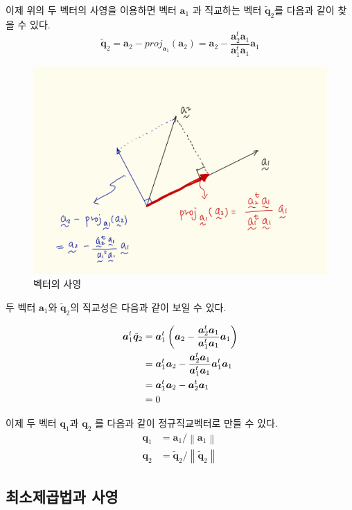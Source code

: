 \documentclass[
]{book}
\newcommand{\norm}[1]{\left\lVert#1\right\rVert}
\theoremstyle{definition}
\theoremstyle{definition}
\theoremstyle{definition}
\theoremstyle{remark}
\begin{document}
이제 위의 두 벡터의 사영을 이용하면 벡터 \(\bm a_1\) 과 직교하는 벡터 \(\tilde {\bm q}_2\)를 다음과 같이 찾을 수 있다.
\[ \tilde {\bm q}_2 = \bm a_2 - proj_{\bm a_1} (\bm a_2) = \bm a_2 -  \frac{\bm a_2^t \bm a_1} {\bm a_1^t \bm a_1} \bm a_1 \]

\begin{figure}
\centering
\includegraphics{proj1.png}
\caption{벡터의 사영}
\end{figure}

두 벡터 \(\bm a_1\)와 \(\tilde {\bm q}_2\)의 직교성은 다음과 같이 보일 수 있다.

\begin{align}
\bm a_1^t  \tilde {\bm q}_2 & =
 \bm a_1^t  \left ( \bm a_2 -  \frac{ \bm a_2^t \bm a_1} {\bm a_1^t \bm a_1} \bm a_1 \right ) \notag \\
 & = \bm a_1^t \bm a_2 - \frac{ \bm a_2^t \bm a_1} {\bm a_1^t \bm a_1}  \bm a_1^t \bm a_1 \notag \\
 & = \bm a_1^t \bm a_2 - \bm a_2^t \bm a_1 \notag \\
 & = 0 
 \label{eq:proofortho}
\end{align}

이제 두 벡터 \(\bm q_1\)과 \(\bm q_2\) 를 다음과 같이 정규직교벡터로 만들 수 있다.
\begin{align*}
\bm q_1 & =  \bm a_1 / \norm{\bm a_1 } \\
\bm q_2 & =  \tilde {\bm q}_2 / \norm{\tilde {\bm q}_2}
\end{align*}

\hypertarget{uxcd5cuxc18cuxc81cuxacf1uxbc95uxacfc-uxc0acuxc601}{%
\subsection{최소제곱법과 사영}\label{uxcd5cuxc18cuxc81cuxacf1uxbc95uxacfc-uxc0acuxc601}}
\end{document}
